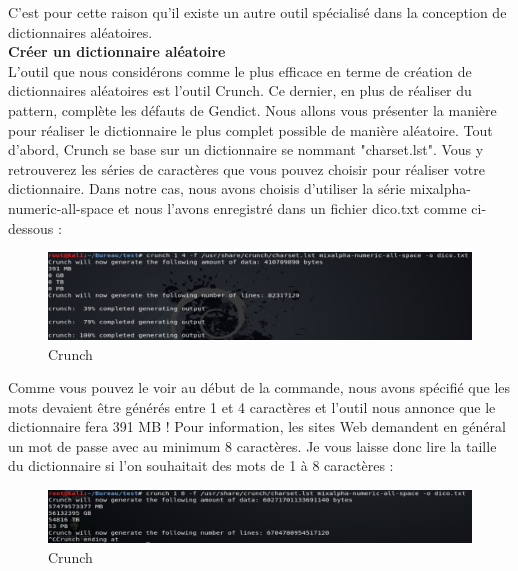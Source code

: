 C'est pour cette raison qu'il existe un autre outil spécialisé dans la conception de dictionnaires aléatoires.\\

\noindent \textbf{Créer un dictionnaire aléatoire}\\

L'outil que nous considérons comme le plus efficace en terme de création de dictionnaires aléatoires est l'outil Crunch. Ce dernier, en plus de réaliser du pattern, complète les défauts de Gendict. Nous allons vous présenter la manière pour réaliser le dictionnaire le plus complet possible de manière aléatoire. Tout d'abord, Crunch se base sur un dictionnaire se nommant "charset.lst". Vous y retrouverez les séries de caractères que vous pouvez choisir pour réaliser votre dictionnaire. Dans notre cas, nous avons choisis d'utiliser la série mixalpha-numeric-all-space et nous l'avons enregistré dans un fichier dico.txt comme ci-dessous :

\begin{figure}[htp!]
  \centering
  \setlength\figureheight{7cm}
  \setlength\figurewidth{9cm}
  \includegraphics[width=1\textwidth]{oui/images/Dirb/crunch.PNG}
  \caption{Crunch}
  \label{fig:courbe-tikz}
\end{figure}

Comme vous pouvez le voir au début de la commande, nous avons spécifié que les mots devaient être générés entre 1 et 4 caractères et l'outil nous annonce que le dictionnaire fera 391 MB ! Pour information, les sites Web demandent en général un mot de passe avec au minimum 8 caractères. Je vous laisse donc lire la taille du dictionnaire si l'on souhaitait des mots de 1 à  8 caractères :

\begin{figure}[htp!]
  \centering
  \setlength\figureheight{7cm}
  \setlength\figurewidth{9cm}
  \includegraphics[width=1\textwidth]{oui/images/Dirb/crunch2.PNG}
  \caption{Crunch}
  \label{fig:courbe-tikz}
\end{figure}

